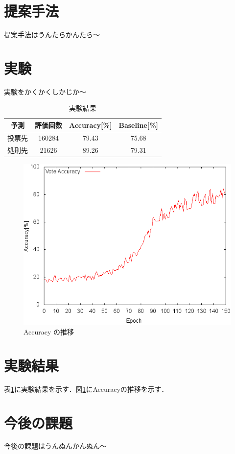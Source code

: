 \documentclass[twocolumn]{jarticle}     %
\begin{document}
\section{提案手法}
提案手法はうんたらかんたら〜

\section{実験}
実験をかくかくしかじか〜

	\begin{table}
		\caption{実験結果}
		\begin{tabular}[width=\linewidth]{|c|c|c|c|} \hline
			予測 & 評価回数 & Accuracy[\%] & Baseline[\%] \\ \hline \hline
			投票先 & 160284 & 79.43 & 75.68 \\ \hline
			処刑先 & 21626 & 89.26 & 79.31 \\ \hline
 		\end{tabular}
		\label{tb:data}
	\end{table}

	\begin{figure}
		\includegraphics[width=\linewidth]{accuracy.png}		%
		\caption{Accuracy の推移}
		\label{fig:accuracy}
	\end{figure}


\section{実験結果}
表\ref{tb:data}に実験結果を示す．図\ref{fig:accuracy}にAccuracyの推移を示す．

\section{今後の課題}
今後の課題はうんぬんかんぬん〜



\end{document}
